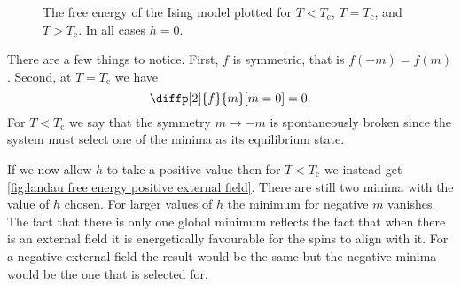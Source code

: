 \documentclass[fleqn]{NotesClass}
\begin{document}
    \begin{figure}
        \caption[Free energy of the Ising model.]{The free energy of the Ising model plotted for \(T < T_{\mathrm{c}}\), \(T = T_{\mathrm{c}}\), and \(T > T_{\mathrm{c}}\). In all cases \(h = 0\).}
        \label{fig:landau free energy}
    \end{figure}
    
    There are a few things to notice.
    First, \(f\) is symmetric, that is \(f(-m) = f(m)\).
    Second, at \(T = T_{\mathrm{c}}\) we have
    \begin{equation}
        \diffp[2]{f}{m}[m = 0] = 0.
    \end{equation}
    For \(T < T_{\mathrm{c}}\) we say that the symmetry \(m \to -m\) is spontaneously broken since the system must select one of the minima as its equilibrium state.
    
    If we now allow \(h\) to take a positive value then for \(T < T_{\mathrm{c}}\) we instead get \cref{fig:landau free energy positive external field}.
    There are still two minima with the value of \(h\) chosen.
    For larger values of \(h\) the minimum for negative \(m\) vanishes.
    The fact that there is only one global minimum reflects the fact that when there is an external field it is energetically favourable for the spins to align with it.
    For a negative external field the result would be the same but the negative minima would be the one that is selected for.
    
\end{document}
